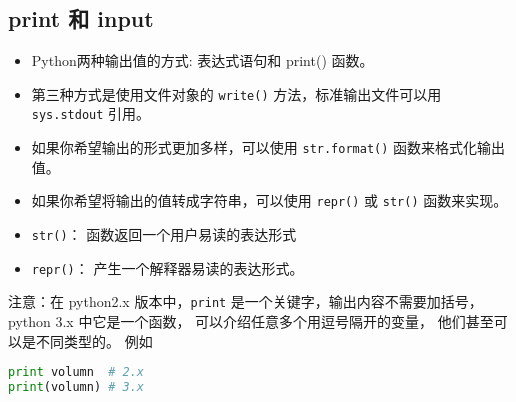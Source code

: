 
\begin{issues}
\issueTODO
\issueDraft
\end{issues}


\subsection{print 和 input}

\begin{itemize}
\item Python两种输出值的方式: 表达式语句和 print() 函数。
\item 第三种方式是使用文件对象的 \verb|write()| 方法，标准输出文件可以用 \verb|sys.stdout| 引用。
\item 如果你希望输出的形式更加多样，可以使用 \verb|str.format()| 函数来格式化输出值。
\item 如果你希望将输出的值转成字符串，可以使用 \verb|repr()| 或 \verb|str()| 函数来实现。
\end{itemize}

\begin{itemize}
\item \verb|str()|： 函数返回一个用户易读的表达形式
\item \verb|repr()|： 产生一个解释器易读的表达形式。
\end{itemize}

注意：在 python2.x 版本中，\verb|print| 是一个关键字，输出内容不需要加括号， python 3.x 中它是一个函数， 可以介绍任意多个用逗号隔开的变量， 他们甚至可以是不同类型的。 例如
\begin{lstlisting}[language=python]
print volumn  # 2.x
print(volumn) # 3.x
\end{lstlisting}

